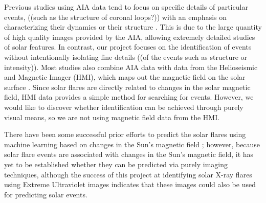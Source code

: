 \documentclass[12pt, letterpaper]{article}
\begin{document}
Previous studies using AIA data tend to focus on specific details of particular events, ((such as the structure of coronal loops?)) with an emphasis on characterizing their dynamics \cite{Dai2021}\cite{Chitta2018} or their structure \cite{Aschwanden2017}. This is due to the large quantity of high quality images provided by the AIA, allowing extremely detailed studies of solar features. In contrast, our project focuses on the identification of events without intentionally isolating fine details ((of the events such as structure or intensity)). Most studies also combine AIA data with data from the Helioseismic and Magnetic Imager (HMI), which maps out the magnetic field on the solar surface \cite{Dai2021}\cite{Chitta2018}. Since solar flares are directly related to changes in the solar magnetic field, HMI data provides a simple method for searching for events. However, we would like to discover whether identification can be achieved through purely visual means, so we are not using magnetic field data from the HMI.

There have been some successful prior efforts to predict the solar flares using machine learning based on changes in the Sun’s magnetic field \cite{Raboonik2016}; however, because solar flare events are associated with changes in the Sun’s magnetic field, it has yet to be established whether they can be predicted via purely imaging techniques, although the success of this project at identifying solar X-ray flares using Extreme Ultraviolet images indicates that these images could also be used for predicting solar events.
\end{document}

